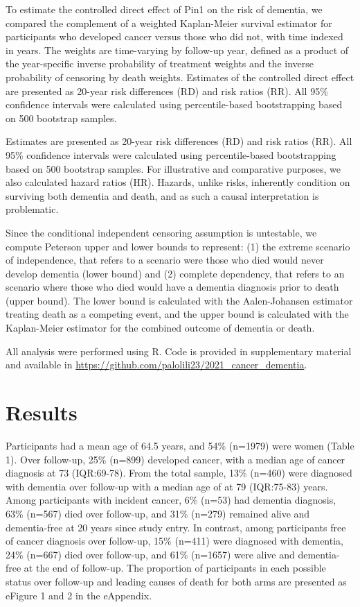 \documentclass[
]{book}
\begin{document}
To estimate the controlled direct effect of Pin1 on the risk of dementia, we compared the complement of a weighted Kaplan-Meier survival estimator for participants who developed cancer versus those who did not, with time indexed in years. The weights are time-varying by follow-up year, defined as a product of the year-specific inverse probability of treatment weights and the inverse probability of censoring by death weights. Estimates of the controlled direct effect are presented as 20-year risk differences (RD) and risk ratios (RR). All 95\% confidence intervals were calculated using percentile-based bootstrapping based on 500 bootstrap samples.

Estimates are presented as 20-year risk differences (RD) and risk ratios (RR). All 95\% confidence intervals were calculated using percentile-based bootstrapping based on 500 bootstrap samples. For illustrative and comparative purposes, we also calculated hazard ratios (HR). Hazards, unlike risks, inherently condition on surviving both dementia and death, and as such a causal interpretation is problematic\autocite{young2020}.

Since the conditional independent censoring assumption is untestable, we compute Peterson upper and lower bounds\autocite{peterson1976} to represent: (1) the extreme scenario of independence, that refers to a scenario were those who died would never develop dementia (lower bound) and (2) complete dependency, that refers to an scenario where those who died would have a dementia diagnosis prior to death (upper bound). The lower bound is calculated with the Aalen-Johansen estimator treating death as a competing event, and the upper bound is calculated with the Kaplan-Meier estimator for the combined outcome of dementia or death.

All analysis were performed using R. Code is provided in supplementary material and available in \url{https://github.com/palolili23/2021_cancer_dementia}.

\hypertarget{results-2}{%
\section{Results}\label{results-2}}

Participants had a mean age of 64.5 years, and 54\% (n=1979) were women (Table 1). Over follow-up, 25\% (n=899) developed cancer, with a median age of cancer diagnosis at 73 (IQR:69-78). From the total sample, 13\% (n=460) were diagnosed with dementia over follow-up with a median age of at 79 (IQR:75-83) years. Among participants with incident cancer, 6\% (n=53) had dementia diagnosis, 63\% (n=567) died over follow-up, and 31\% (n=279) remained alive and dementia-free at 20 years since study entry. In contrast, among participants free of cancer diagnosis over follow-up, 15\% (n=411) were diagnosed with dementia, 24\% (n=667) died over follow-up, and 61\% (n=1657) were alive and dementia-free at the end of follow-up. The proportion of participants in each possible status over follow-up and leading causes of death for both arms are presented as eFigure 1 and 2 in the eAppendix.
\end{document}
